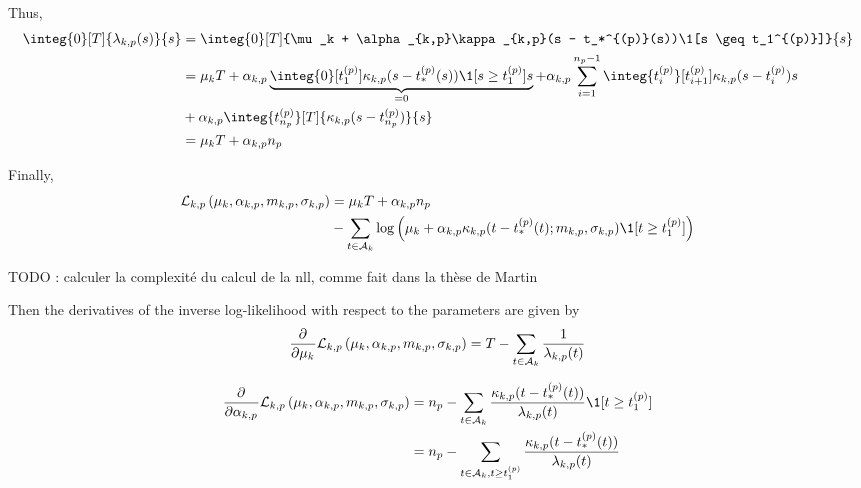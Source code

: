 Thus,
\begin{align*}
    \integ{0}[T]{\lambda_{k,p}(s)}{s} &= \integ{0}[T]{\mu_k + \alpha_{k,p}\kappa_{k,p}(s - t_*^{(p)}(s))\1[s \geq t_1^{(p)}]}{s} \\
    &= \mu_k T + \alpha_{k,p}\underbrace{\integ{0}[t_1^{(p)}]{ \kappa_{k,p}(s - t_*^{(p)}(s))\1[s \geq t_1^{(p)}]}{s}}_{=0} + \alpha_{k,p}\sum_{i=1}^{n_p -1} \integ{t_i^{(p)}}[t_{i+1}^{(p)}]{\kappa_{k,p}(s - t_i^{(p)})}{s} \\
    &+ \alpha_{k,p}\integ{t_{n_p}^{(p)}}[T]{\kappa_{k,p}(s - t_{n_p}^{(p)})}{s} \\
    &= \mu_k T + \alpha_{k,p}n_p
\end{align*}

Finally,
\begin{equation}
\begin{split}
    \mathcal{L}_{k,p}\pars{\mu_k, \alpha_{k,p}, m_{k,p}, \sigma_{k,p}} &= \mu_k T + \alpha_{k,p}n_p \\
    &- \sum_{t\in\mathcal{A}_k} \log \pars{\mu_k + \alpha_{k,p}\kappa_{k,p}(t - t_*^{(p)}(t); m_{k,p}, \sigma_{k,p})\1[t \geq t_1^{(p)}]}
\end{split}
\end{equation}

TODO : calculer la complexité du calcul de la nll, comme fait dans la thèse de Martin

Then the derivatives of the inverse log-likelihood with respect to the parameters are given by
\begin{equation}
    \frac{\partial^{}}{\partial {\mu_k}^{}}\mathcal{L}_{k,p}\left( \mu_k, \alpha_{k,p}, m_{k,p}, \sigma_{k,p} \right) = T - \sum_{t\in\mathcal{A}_k}\frac{1}{\lambda_{k,p}(t)}
\end{equation}

\begin{equation}
\begin{split}
    \partiald{}{\alpha_{k,p}}\mathcal{L}_{k,p}\pars{\mu_k, \alpha_{k,p}, m_{k,p}, \sigma_{k,p}} &= n_p - \sum_{t\in\mathcal{A}_k}\frac{\kappa_{k,p}(t - t_*^{(p)}(t))}{\lambda_{k,p}(t)}\1[t \geq t_1^{(p)}] \\
    &= n_p - \sum_{t\in\mathcal{A}_k, t \geq t_1^{(p)}}\frac{\kappa_{k,p}(t - t_*^{(p)}(t))}{\lambda_{k,p}(t)}
\end{split}
\end{equation}

